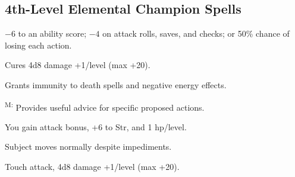 \subsection{4th-Level Elemental Champion Spells}

 $-6$ to an ability score; $-4$ on attack rolls, saves, and checks; or 50\% chance of losing each action.

 Cures 4d8 damage +1/level (max +20).

 Grants immunity to death spells and negative energy effects.

\textsuperscript{M:} Provides useful advice for specific proposed actions.

 You gain attack bonus, +6 to Str, and 1 hp/level.

 Subject moves normally despite impediments.

 Touch attack, 4d8 damage +1/level (max +20).
